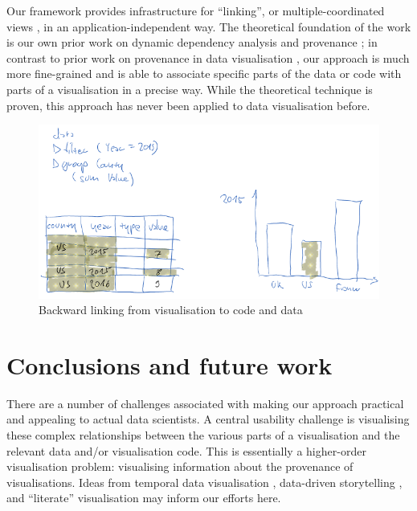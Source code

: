 Our framework provides infrastructure for ``linking'', or multiple-coordinated
views \cite{tobiasz09}, in an application-independent way. The theoretical
foundation of the work is our own prior work on dynamic dependency analysis and
provenance \cite{perera16d, ricciotti17}; in contrast to prior work on
provenance in data visualisation \cite{callahan06}, our approach is much more
fine-grained and is able to associate specific parts of the data or code with
parts of a visualisation in a precise way. While the theoretical technique is
proven, this approach has never been applied to data visualisation before.

\begin{figure}[H]
\includegraphics[scale=0.35]{image/chart-bwd}
\caption{Backward linking from visualisation to code and data}
\end{figure}

\section{Conclusions and future work}

There are a number of challenges associated with making our approach practical
and appealing to actual data scientists. A central usability challenge is
visualising these complex relationships between the various parts of a
visualisation and the relevant data and/or visualisation code. This is
essentially a higher-order visualisation problem: visualising information about
the provenance of visualisations. Ideas from temporal data visualisation
\cite{bach16}, data-driven storytelling \cite{bach18}, and ``literate''
visualisation \cite{wood19} may inform our efforts here.
